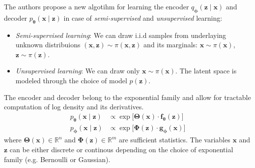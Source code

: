 The authors propose a new algotihm for learning the encoder $q_{\boldsymbol{\phi}}(\boldsymbol{z} \mid \boldsymbol{x})$ and 
decoder $p_{\boldsymbol{\theta}}(\boldsymbol{x} \mid \boldsymbol{z})$ in case of \textit{semi-supervised} and 
\textit{unsupervised} learning:
\begin{itemize}
    \item \textit{Semi-supervised learning}: We can draw i.i.d samples from underlaying unknown distribuions $(\boldsymbol{x},\boldsymbol{z})  \sim \pi(\boldsymbol{x},\boldsymbol{z})$
    and its marginals: $\boldsymbol{x} \sim \pi(\boldsymbol{x})$, $\boldsymbol{z} \sim \pi(\boldsymbol{z})$.
    \item \textit{Unsupervised learning}: We can draw only $\boldsymbol{x} \sim \pi(\boldsymbol{x})$. The latent space is modeled
    through the choice of model $p(\boldsymbol{z})$.
\end{itemize}

The encoder and decoder belong to the exponential family and allow for tractable computation of log density and its derivatives.
\begin{align*}
    p_{\boldsymbol{\theta}}(\boldsymbol{x} \mid \boldsymbol{z}) &\propto \exp \bigl[ \boldsymbol{\Theta}(\boldsymbol{x}) \cdot \boldsymbol{f}_{\boldsymbol{\theta}}(\boldsymbol{z}) \bigr] \\
    p_{\boldsymbol{\phi}}(\boldsymbol{x} \mid \boldsymbol{z}) &\propto \exp \bigl[ \boldsymbol{\Phi}(\boldsymbol{z}) \cdot \boldsymbol{g}_{\boldsymbol{\phi}}(\boldsymbol{x}) \bigr]
\end{align*} 
where $\boldsymbol{\Theta}(\boldsymbol{x}) \in \mathbb{R}^n$ and $ \boldsymbol{\Phi}(\boldsymbol{z}) \in \mathbb{R}^m$ are sufficient
statistics. The variables $\boldsymbol{x}$ and $\boldsymbol{z}$ can be either discrete or continous depending on the choice of exponential family (e.g. Bernoulli or Gaussian). 

